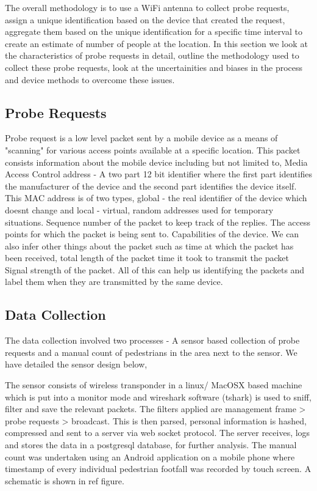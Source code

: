 The overall methodology is to use a WiFi antenna to collect probe requests,
assign a unique identification based on the device that created the request,
aggregate them based on the unique identification for a specific time interval
to create an estimate of number of people at the location.
In this section we look at the characteristics of probe requests in detail,
outline the methodology used to collect these probe requests, 
look at the uncertainities and biases in the process and 
device methods to overcome these issues.

\subsection{Probe Requests}
Probe request is a low level packet sent by a mobile device as a means of
"scanning" for various access points available at a specific location.
This packet consists information about the mobile device
including but not limited to,
Media Access Control address - A two part 12 bit identifier where the first part
identifies the manufacturer of the device and the second part identifies the
device itself. This MAC address is of two types, global - the real identifier
of the device which doesnt change and local - virtual, random addresses used
for temporary situations.
Sequence number of the packet to keep track of the replies.
The access points for which the packet is being sent to.
Capabilities of the device.
We can also infer other things about the packet such as
time at which the packet has been received,
total length of the packet
time it took to transmit the packet
Signal strength of the packet.
All of this can help us identifying the packets and label them when they are transmitted by the same device.

\subsection{Data Collection}
The data collection involved two processes - 
A sensor based collection of probe requests and
a manual count of pedestrians in the area next to the sensor.
We have detailed the sensor design below,

The sensor consists of wireless transponder in a linux/ MacOSX based machine
which is put into a monitor mode and
wireshark software (tshark) is used to sniff, filter and
save the relevant packets.
The filters applied are management frame > probe requests > broadcast. 
This is then parsed, personal information is hashed, 
compressed and sent to a server via web socket protocol.
The server receives, logs and stores the data in a postgresql database,
for further analysis.
The manual count was undertaken using an Android application
on a mobile phone where timestamp of every individual pedestrian footfall
was recorded by touch screen. A schematic is shown in ref figure.

